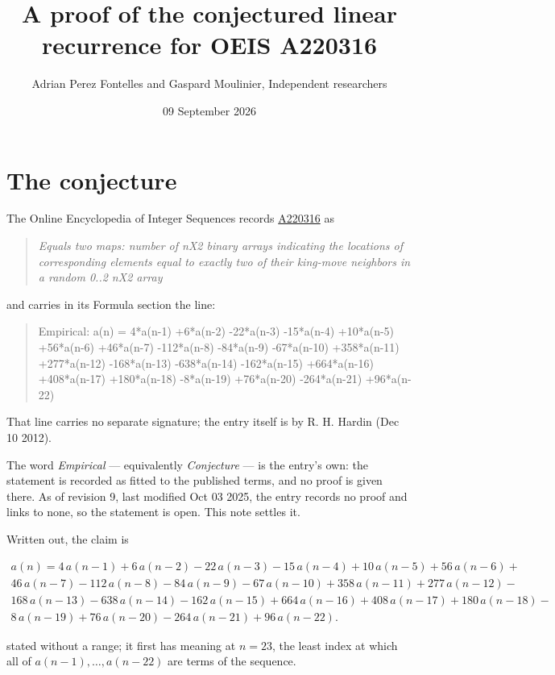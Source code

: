 \documentclass[11pt]{article}
\title{A proof of the conjectured linear recurrence for OEIS A220316}
\author{Adrian Perez Fontelles and Gaspard Moulinier, Independent researchers}
\date{09 September 2026}
\theoremstyle{definition}
\begin{document}
\maketitle
\section{The conjecture}

The Online Encyclopedia of Integer Sequences records \href{https://oeis.org/A220316}{A220316} as

\begin{quote}\itshape Equals two maps: number of nX2 binary arrays indicating the locations of corresponding elements equal to exactly two of their king-move neighbors in a random 0..2 nX2 array\end{quote}

and carries in its Formula section the line:

\begin{quote}\ttfamily Empirical: a(n) = 4*a(n-1) +6*a(n-2) -22*a(n-3) -15*a(n-4) +10*a(n-5) +56*a(n-6) +46*a(n-7) -112*a(n-8) -84*a(n-9) -67*a(n-10) +358*a(n-11) +277*a(n-12) -168*a(n-13) -638*a(n-14) -162*a(n-15) +664*a(n-16) +408*a(n-17) +180*a(n-18) -8*a(n-19) +76*a(n-20) -264*a(n-21) +96*a(n-22)\end{quote}

That line carries no separate signature; the entry itself is by R. H. Hardin (Dec 10 2012).

The word {\itshape Empirical} --- equivalently {\itshape Conjecture} --- is the entry's own: the statement is recorded as fitted to the published terms, and no proof is given there. As of revision 9, last modified Oct 03 2025, the entry records no proof and links to none, so the statement is open. This note settles it.

Written out, the claim is

\begin{multline*} a(n) = 4\,a(n-1) + 6\,a(n-2) - 22\,a(n-3) - 15\,a(n-4) + 10\,a(n-5) + 56\,a(n-6) + \\ 46\,a(n-7) - 112\,a(n-8) - 84\,a(n-9) - 67\,a(n-10) + 358\,a(n-11) + 277\,a(n-12) - \\ 168\,a(n-13) - 638\,a(n-14) - 162\,a(n-15) + 664\,a(n-16) + 408\,a(n-17) + 180\,a(n-18) - \\ 8\,a(n-19) + 76\,a(n-20) - 264\,a(n-21) + 96\,a(n-22). \end{multline*}

stated without a range; it first has meaning at $n = 23$, the least index at which all of $a(n-1),\dots,a(n-22)$ are terms of the sequence.
\end{document}
